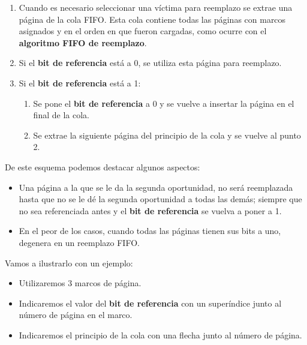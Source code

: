\begin{enumerate}
\def\labelenumi{\arabic{enumi}.}
\item
  Cuando es necesario seleccionar una víctima para reemplazo se extrae
  una página de la cola FIFO. Esta cola contiene todas las páginas con
  marcos asignados y en el orden en que fueron cargadas, como ocurre con
  el \textbf{algoritmo FIFO de reemplazo}.
\item
  Si el \textbf{bit de referencia} está a 0, se utiliza esta página para
  reemplazo.
\item
  Si el \textbf{bit de referencia} está a 1:

  \begin{enumerate}
  \def\labelenumii{\alph{enumii}.}
  \item
    Se pone el \textbf{bit de referencia} a 0 y se vuelve a insertar la
    página en el final de la cola.
  \item
    Se extrae la siguiente página del principio de la cola y se vuelve
    al punto 2.
  \end{enumerate}
\end{enumerate}

De este esquema podemos destacar algunos aspectos:

\begin{itemize}
\item
  Una página a la que se le da la segunda oportunidad, no será
  reemplazada hasta que no se le dé la segunda oportunidad a todas las
  demás; siempre que no sea referenciada antes y el \textbf{bit de
  referencia} se vuelva a poner a 1.
\item
  En el peor de los casos, cuando todas las páginas tienen sus bits a
  uno, degenera en un reemplazo FIFO.
\end{itemize}

Vamos a ilustrarlo con un ejemplo:

\begin{itemize}
\item
  Utilizaremos 3 marcos de página.
\item
  Indicaremos el valor del \textbf{bit de referencia} con un superíndice
  junto al número de página en el marco.
\item
  Indicaremos el principio de la cola con una flecha junto al número de
  página.
\end{itemize}

